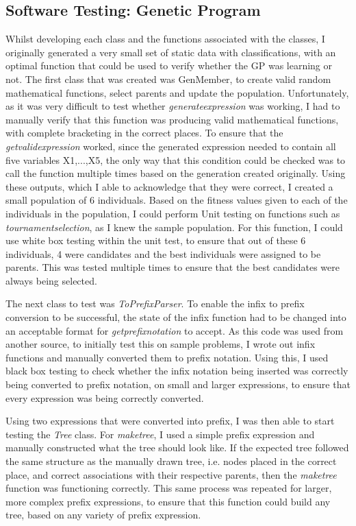 \documentclass[11pt]{article}
\begin{document}
\subsection{Software Testing: Genetic Program}
Whilst developing each class and the functions associated with the classes, I originally generated a very small set of static data with classifications, with an optimal function that could be used to verify whether the GP was learning or not. 
The first class that was created was GenMember, to create valid random mathematical functions, select parents and update the population. Unfortunately, as it was very difficult to test whether \textit{generate\textunderscore expression} was working, I had to manually verify that this function was producing valid mathematical functions, with complete bracketing in the correct places. To ensure that the \textit{get\textunderscore valid\textunderscore expression} worked, since the generated expression needed to contain all five variables X1,...,X5, the only way that this condition could be checked was to call the function multiple times based on the generation created originally. Using these outputs, which I able to acknowledge that they were correct, I created a small population of 6 individuals. Based on the fitness values given to each of the individuals in the population, I could perform Unit testing on functions such as \textit{tournament\textunderscore selection}, as I knew the sample population. For this function, I could use white box testing within the unit test, to ensure that out of these 6 individuals, 4 were candidates and the best individuals were assigned to be parents. This was tested multiple times to ensure that the best candidates were always being selected. 
 
The next class to test was \textit{ToPrefixParser}. To enable the infix to prefix conversion to be successful, the state of the infix function had to be changed into an acceptable format for 
\textit{get\textunderscore prefix\textunderscore notation} to accept. As this code was used from another source, to initially test this on sample problems, I wrote out infix functions and manually converted them to prefix notation. Using this, I used black box testing to check whether the infix notation being inserted was correctly being converted to prefix notation, on small and larger expressions, to ensure that every expression was being correctly converted. 

Using two expressions that were converted into prefix, I was then able to start testing the \textit{Tree} class. For \textit{make\textunderscore tree}, I used a simple prefix expression
and manually constructed what the tree should look like. If the expected tree followed the same structure as the manually drawn tree, i.e. nodes placed in the correct place, and correct associations with their respective parents, then the \textit{make\textunderscore tree} function was functioning correctly.  This same process was repeated for larger, more complex prefix expressions, to ensure that this function could build any tree, based on any variety of prefix expression.  
\end{document}
